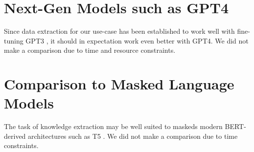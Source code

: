 \section{Next-Gen Models such as GPT4}\label{sec:next-gen}
Since data extraction for our use-case has been established to work well with fine-tuning \gls{GPT3} \cite{dunn_structured_2022}, it should in expectation work even better with \gls{GPT4}.
We did not make a comparison due to time and resource constraints.

\section{Comparison to Masked Language Models}\label{sec:masked}
The task of knowledge extraction may be well suited to \glspl{masked} modern \gls{BERT}-derived architectures such as T5 \cite{raffel_exploring_2020}.
We did not make a comparison due to time constraints.
